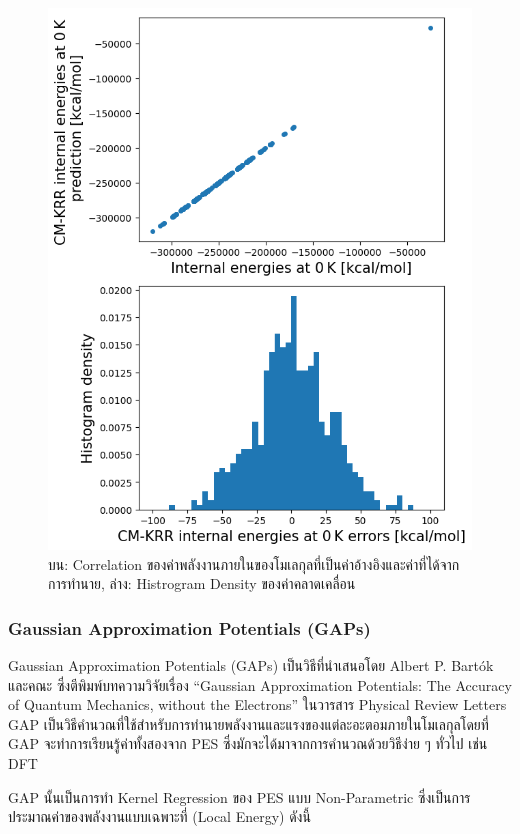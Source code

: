 \begin{figure}[H]
    \centering
    \includegraphics[width=0.75\linewidth]{fig/qm9_cm_kernel_corr.png}
    \caption{บน: Correlation ของค่าพลังงานภายในของโมเลกุลที่เป็นค่าอ้างอิงและค่าที่ได้จากการทำนาย, ล่าง: Histrogram Density ของค่าคลาดเคลื่อน}
    \label{fig:qm9_cm_kernel_corr}
\end{figure}

\subsubsection{Gaussian Approximation Potentials (GAPs)} 

Gaussian Approximation Potentials (GAPs) เป็นวิธีที่นำเสนอโดย Albert P. Bart\'{o}k และคณะ ซึ่งตีพิมพ์บทความวิจัยเรื่อง \enquote{Gaussian Approximation Potentials: The Accuracy of Quantum Mechanics, without the Electrons} ในวารสาร Physical Review Letters\autocite{bartok2010} GAP เป็นวิธีคำนวณที่ใช้สำหรับการทำนายพลังงานและแรงของแต่ละอะตอมภายในโมเลกุลโดยที่ GAP จะทำการเรียนรู้ค่าทั้งสองจาก PES ซึ่งมักจะได้มาจากการคำนวณด้วยวิธีง่าย ๆ ทั่วไป เช่น DFT

GAP นั้นเป็นการทำ Kernel Regression ของ PES แบบ Non-Parametric ซึ่งเป็นการประมาณค่าของพลังงานแบบเฉพาะที่ (Local Energy) ดังนี้

